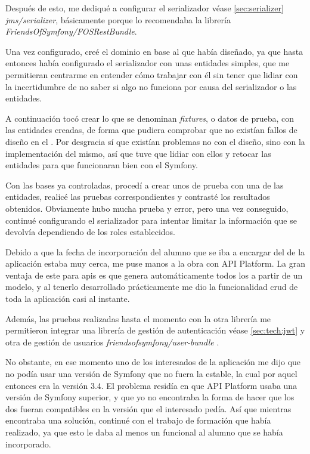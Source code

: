 Después de esto, me dediqué a configurar el serializador \textemdash véase
\ref{sec:serializer} \textemdash \textit{jms/serializer}, básicamente porque
lo recomendaba la librería \textit{FriendsOfSymfony/FOSRestBundle}.

Una vez configurado, creé el dominio en base al  que había diseñado, ya que hasta entonces había configurado
el serializador con unas entidades simples, que me permitieran centrarme en
entender cómo trabajar con él sin tener que lidiar con la incertidumbre de
no saber si algo no funciona por causa del serializador o las entidades.

A continuación tocó crear lo que se denominan \textit{fixtures}, o datos de
prueba, con las entidades creadas, de forma que pudiera comprobar que no
existían fallos de diseño en el .
Por desgracia sí que existían problemas no con el diseño, sino con la
implementación del mismo, así que tuve que lidiar con ellos y retocar las
entidades para que funcionaran bien con el 
Symfony.

Con las bases ya controladas, procedí a crear unos 
de prueba con una de las entidades, realicé las pruebas correspondientes y contrasté
los resultados obtenidos. Obviamente hubo mucha prueba y error, pero una vez
conseguido, continué configurando el serializador para intentar limitar la
información que se devolvía dependiendo de los roles establecidos.

Debido a que la fecha de incorporación del alumno que se iba a encargar del 
de la aplicación estaba muy cerca, me puse manos a la obra con API Platform. La
gran ventaja de este  para \gls{api}s es que
genera automáticamente todos los  a partir de un modelo,
y al tenerlo desarrollado prácticamente me dio la funcionalidad \gls{crud} de toda
la aplicación casi al instante.

Además, las pruebas realizadas hasta el momento con la otra librería me permitieron
integrar una librería de gestión de autenticación \textemdash véase \ref{sec:tech:jwt}
\textemdash y otra de gestión de usuarios \textemdash \textit{friendsofsymfony/user-bundle}
\textemdash.

No obstante, en ese momento uno de los interesados de la aplicación me dijo que no
podía usar una versión de Symfony que no fuera la estable, la cual por aquel
entonces era la versión 3.4. El problema residía en que API Platform usaba una
versión de Symfony superior, y que yo no encontraba la forma de hacer que
los dos  fueran compatibles en la versión que
el interesado pedía. Así que mientras encontraba una solución, continué con
el trabajo de formación que había realizado, ya que esto le daba al menos un
 funcional al alumno que se había incorporado.

